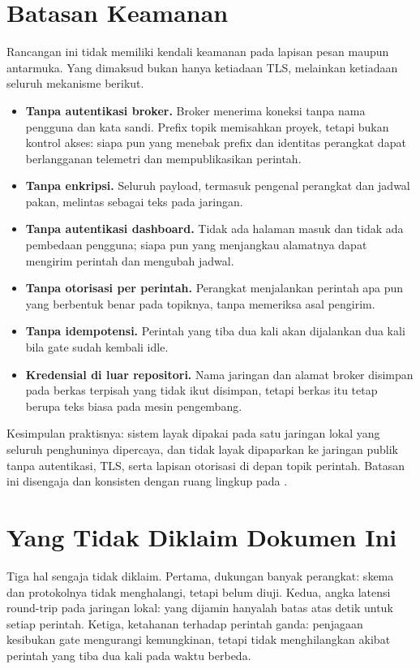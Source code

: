 \section{Batasan Keamanan}

Rancangan ini tidak memiliki kendali keamanan pada lapisan pesan maupun antarmuka.
Yang dimaksud bukan hanya ketiadaan TLS, melainkan ketiadaan seluruh mekanisme
berikut.
\begin{itemize}[leftmargin=*,itemsep=2pt]
  \item \textbf{Tanpa autentikasi broker.} Broker menerima koneksi tanpa nama
        pengguna dan kata sandi. Prefix topik memisahkan proyek, tetapi bukan
        kontrol akses: siapa pun yang menebak prefix dan identitas perangkat dapat
        berlangganan telemetri dan mempublikasikan perintah.
  \item \textbf{Tanpa enkripsi.} Seluruh payload, termasuk pengenal perangkat dan
        jadwal pakan, melintas sebagai teks pada jaringan.
  \item \textbf{Tanpa autentikasi dashboard.} Tidak ada halaman masuk dan tidak ada
        pembedaan pengguna; siapa pun yang menjangkau alamatnya dapat mengirim
        perintah dan mengubah jadwal.
  \item \textbf{Tanpa otorisasi per perintah.} Perangkat menjalankan perintah apa pun
        yang berbentuk benar pada topiknya, tanpa memeriksa asal pengirim.
  \item \textbf{Tanpa idempotensi.} Perintah yang tiba dua kali akan dijalankan dua
        kali bila gate sudah kembali idle.
  \item \textbf{Kredensial di luar repositori.} Nama jaringan dan alamat broker
        disimpan pada berkas terpisah yang tidak ikut disimpan, tetapi berkas itu
        tetap berupa teks biasa pada mesin pengembang.
\end{itemize}

Kesimpulan praktisnya: sistem layak dipakai pada satu jaringan lokal yang seluruh
penghuninya dipercaya, dan tidak layak dipaparkan ke jaringan publik tanpa
autentikasi, TLS, serta lapisan otorisasi di depan topik perintah. Batasan ini
disengaja dan konsisten dengan ruang lingkup pada .

\section{Yang Tidak Diklaim Dokumen Ini}

Tiga hal sengaja tidak diklaim. Pertama, dukungan banyak perangkat: skema dan
protokolnya tidak menghalangi, tetapi belum diuji. Kedua, angka latensi round-trip
pada jaringan lokal: yang dijamin hanyalah batas atas \CmdTimeoutS{} detik untuk
setiap perintah. Ketiga, ketahanan terhadap perintah ganda: penjagaan kesibukan gate
mengurangi kemungkinan, tetapi tidak menghilangkan akibat perintah yang tiba dua kali
pada waktu berbeda.
